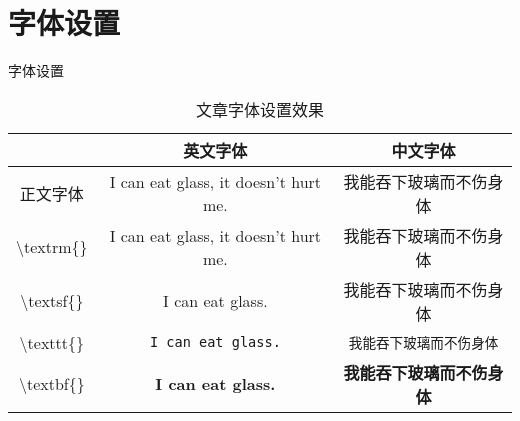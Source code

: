 \section{字体设置}
字体设置
\begin{table}[htb]
	\caption{文章字体设置效果}
	\label{tab:文章字体设置效果}
	\begin{center}
		\begin{tabular}{ccc}
			\toprule
					& 英文字体 & 中文字体  \\
			\midrule
			正文字体 & I can eat glass, it doesn't hurt me. & 我能吞下玻璃而不伤身体 \\
			\textbackslash textrm\{\} & \textrm{I can eat glass, it doesn't hurt me.} & \textrm{我能吞下玻璃而不伤身体} \\
			\textbackslash textsf\{\} & \textsf{I can eat glass.} & \textsf{我能吞下玻璃而不伤身体} \\
			\textbackslash texttt\{\} & \texttt{I can eat glass.} & \texttt{我能吞下玻璃而不伤身体} \\
			\textbackslash textbf\{\} & \textbf{I can eat glass.} & \textbf{我能吞下玻璃而不伤身体} \\
			\bottomrule
		\end{tabular}
	\end{center}
\end{table}
